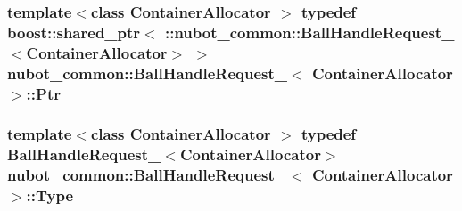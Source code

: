 \hypertarget{structnubot__common_1_1BallHandleRequest___a36db0f707fee62292ba7cce6bb70d01f}{
\subsubsection[{Ptr}]{\setlength{\rightskip}{0pt plus 5cm}template$<$class Container\-Allocator $>$ typedef boost\-::shared\-\_\-ptr$<$ \-::{\bf nubot\-\_\-common\-::\-Ball\-Handle\-Request\-\_\-}$<$Container\-Allocator$>$ $>$ {\bf nubot\-\_\-common\-::\-Ball\-Handle\-Request\-\_\-}$<$ Container\-Allocator $>$\-::{\bf Ptr}}}\label{structnubot__common_1_1BallHandleRequest___a36db0f707fee62292ba7cce6bb70d01f}
\hypertarget{structnubot__common_1_1BallHandleRequest___a83dbef9a3630b37c8b27bfd32ee5a7b6}{
\subsubsection[{Type}]{\setlength{\rightskip}{0pt plus 5cm}template$<$class Container\-Allocator $>$ typedef {\bf Ball\-Handle\-Request\-\_\-}$<$Container\-Allocator$>$ {\bf nubot\-\_\-common\-::\-Ball\-Handle\-Request\-\_\-}$<$ Container\-Allocator $>$\-::{\bf Type}}}\label{structnubot__common_1_1BallHandleRequest___a83dbef9a3630b37c8b27bfd32ee5a7b6}


